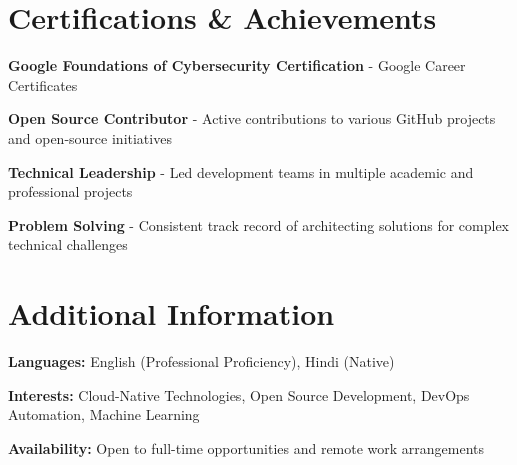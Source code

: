 \documentclass[letterpaper,11pt]{article}
\begin{document}
\section{Certifications \& Achievements}
\begin{itemize}[leftmargin=0.15in, label={}]
\small{
    \item \textbf{Google Foundations of Cybersecurity Certification} - Google Career Certificates
    \item \textbf{Open Source Contributor} - Active contributions to various GitHub projects and open-source initiatives
    \item \textbf{Technical Leadership} - Led development teams in multiple academic and professional projects
    \item \textbf{Problem Solving} - Consistent track record of architecting solutions for complex technical challenges
}
\end{itemize}

\section{Additional Information}
\begin{itemize}[leftmargin=0.15in, label={}]
\small{
    \item \textbf{Languages:} English (Professional Proficiency), Hindi (Native)
    \item \textbf{Interests:} Cloud-Native Technologies, Open Source Development, DevOps Automation, Machine Learning
    \item \textbf{Availability:} Open to full-time opportunities and remote work arrangements
}
\end{itemize}
\end{document}
